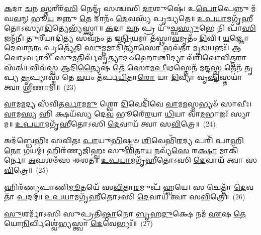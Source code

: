 {\anuvakamend[{\-\ul{𑌮}\-𑌹𑌾\-\ul{𑌨𑍍𑌨𑍃}\-𑌵𑌤𑍍𑌷𑌡𑍍𑌵𑌿𑍞᳴𑌶𑌤𑌿𑌃}]}%

\-\ul{𑌕}\-𑌦𑌾 \ul{𑌚}\-𑌨 \ul{𑌸𑍍𑌤}\-𑌰𑍀𑌰᳴\-\ul{𑌸𑌿} 𑌨𑍇𑌨𑍍𑌦𑍍𑌰᳴ 𑌸𑌶𑍍𑌚𑌸𑌿 \ul{𑌦𑌾}\-𑌶𑍁𑌷𑍇॑। 𑌉\-\ul{𑌪𑍋}\-𑌪𑍇𑌨𑍍𑌨𑍁 𑌮᳴𑌘\-\ul{𑌵}\-𑌨𑍍 𑌭𑍂\-\ul{𑌯} 𑌇𑌨𑍍𑌨𑍁 \ul{𑌤𑍇} 𑌦𑌾𑌨𑌂᳴ \ul{𑌦𑍇}\-𑌵𑌸𑍍𑌯᳴ 𑌪𑍃𑌚𑍍𑌯𑌤𑍇॥ \ul{𑌉}\-\-\ul{𑌪}\-\-\ul{𑌯𑌾}\-𑌮𑌗𑍃᳴𑌹𑍀𑌤𑍋\-𑌽𑌸𑍍𑌯𑌾\-\ul{𑌦𑌿}\-𑌤𑍍𑌯𑍇𑌭𑍍𑌯᳴𑌸𑍍𑌤𑍍𑌵𑌾॥ \ul{𑌕}\-𑌦𑌾 \ul{𑌚}\-𑌨 𑌪𑍍𑌰 𑌯𑍁᳴𑌚𑍍𑌛\-\ul{𑌸𑍍𑌯𑍁}\-𑌭𑍇 𑌨𑌿 𑌪𑌾᳴\-\ul{𑌸𑌿} 𑌜𑌨𑍍𑌮᳴𑌨𑍀। 𑌤𑍁𑌰𑍀᳴𑌯𑌾𑌦𑌿\-\ul{𑌤𑍍𑌯} 𑌸𑌵᳴𑌨𑌂 𑌤 𑌇\-\ul{𑌨𑍍𑌦𑍍𑌰𑌿}\-𑌯𑌮𑌾 𑌤᳴𑌸𑍍𑌥𑌾\-\ul{𑌵}\-𑌮𑍃𑌤𑌂᳴ \ul{𑌦𑌿}\-𑌵𑌿॥ \ul{𑌯}\-𑌜𑍍𑌞𑍋 \ul{𑌦𑍇}\-𑌵𑌾\-\ul{𑌨𑌾𑌂} 𑌪𑍍𑌰𑌤𑍍𑌯𑍇᳴𑌤𑌿 \ul{𑌸𑍁}\-𑌮𑍍𑌨𑌮𑌾𑌦𑌿᳴𑌤𑍍𑌯𑌾\-\ul{𑌸𑍋} 𑌭𑌵᳴𑌤𑌾 𑌮𑍃\-\ul{𑌡}\-𑌯𑌨𑍍𑌤𑌃᳴। 𑌆 \ul{𑌵𑍋}\-𑌽𑌰𑍍𑌵𑌾𑌚𑍀᳴ 𑌸𑍁\-\ul{𑌮}\-𑌤𑌿𑌰𑍍𑌵᳴𑌵𑍃𑌤𑍍𑌯𑌾\-\ul{𑌦}\-\-\ul{𑍞}\-𑌹𑍋\-\ul{𑌶𑍍𑌚𑌿}\-𑌦𑍍𑌯𑌾 𑌵᳴𑌰𑌿\-\ul{𑌵𑍋}\-𑌵𑌿\-\ul{𑌤𑍍𑌤}\-𑌰𑌾𑌸᳴𑌤𑍍॥ 𑌵𑌿𑌵᳴𑌸𑍍𑌵 𑌆𑌦𑌿\-\ul{𑌤𑍍𑌯𑍈}\-𑌷 𑌤𑍇᳴ 𑌸𑍋𑌮\-\ul{𑌪𑍀}\-𑌥𑌸𑍍𑌤𑍇𑌨᳴ 𑌮𑌨𑍍𑌦\-\ul{𑌸𑍍𑌵} 𑌤𑍇𑌨᳴ 𑌤𑍃𑌪𑍍𑌯 \ul{𑌤𑍃}\-𑌪𑍍𑌯𑌾𑌸𑍍𑌮᳴ 𑌤𑍇 \ul{𑌵}\-𑌯𑌂 𑌤᳴𑌰𑍍𑌪\-\ul{𑌯𑌿}\-𑌤𑌾\-\ul{𑌰𑍋} 𑌯𑌾 \ul{𑌦𑌿}\-𑌵𑍍𑌯𑌾 𑌵𑍃\-\ul{𑌷𑍍𑌟𑌿}\-𑌸𑍍𑌤𑌯𑌾॑ 𑌤𑍍𑌵𑌾 𑌶𑍍𑌰𑍀𑌣𑌾𑌮𑌿॥~(23)

{\anuvakamend[{\-\ul{𑌵𑌃} \ul{𑌸}\-𑌪𑍍𑌤𑌵𑌿𑍞᳴𑌶𑌤𑌿𑌶𑍍𑌚}]}%

\-\ul{𑌵𑌾}\-𑌮\-\ul{𑌮}\-𑌦𑍍𑌯 𑌸᳴𑌵𑌿𑌤\-\ul{𑌰𑍍𑌵𑌾}\-𑌮\-\ul{𑌮𑍁} 𑌶𑍍𑌵𑍋 \ul{𑌦𑌿}\-𑌵𑍇𑌦𑌿᳴𑌵𑍇 \ul{𑌵𑌾}\-𑌮\-\ul{𑌮}\-𑌸𑍍𑌮𑌭𑍍𑌯𑍞᳴ 𑌸𑌾𑌵𑍀𑌃। \ul{𑌵𑌾}\-𑌮\-\ul{𑌸𑍍𑌯} 𑌹𑌿 𑌕𑍍𑌷𑌯᳴𑌸𑍍𑌯 𑌦𑍇\-\ul{𑌵} 𑌭𑍂𑌰𑍇᳴\-\ul{𑌰}\-𑌯𑌾 \ul{𑌧𑌿}\-𑌯𑌾 𑌵𑌾᳴\-\ul{𑌮}\-𑌭𑌾𑌜𑌃᳴ 𑌸𑍍𑌯𑌾𑌮॥ \ul{𑌉}\-\-\ul{𑌪}\-\-\ul{𑌯𑌾}\-𑌮𑌗𑍃᳴𑌹𑍀𑌤𑍋\-𑌽𑌸𑌿 \ul{𑌦𑍇}\-𑌵𑌾𑌯᳴ 𑌤𑍍𑌵𑌾 𑌸\-\ul{𑌵𑌿}\-𑌤𑍍𑌰𑍇॥~(24)

{\anuvakamend[{\-\ul{𑌵𑌾}\-𑌮𑌂 𑌚𑌤𑍁᳴𑌰𑍍𑌵𑌿𑍞𑌶𑌤𑌿𑌃}]}%

𑌅𑌦᳴𑌬𑍍𑌧𑍇𑌭𑌿𑌃 𑌸𑌵𑌿𑌤𑌃 \ul{𑌪𑌾}\-𑌯𑍁\-\ul{𑌭𑌿}\-𑌷𑍍𑌟𑍍𑌵𑍞 \ul{𑌶𑌿}\-𑌵𑍇𑌭𑌿᳴\-\ul{𑌰}\-𑌦𑍍𑌯 𑌪𑌰𑌿᳴ 𑌪𑌾𑌹𑌿 \ul{𑌨𑍋} 𑌗𑌯𑌮𑍍॑। 𑌹𑌿𑌰᳴𑌣𑍍𑌯𑌜𑌿𑌹𑍍𑌵𑌃 𑌸𑍁\-\ul{𑌵𑌿}\-𑌤𑌾\-\ul{𑌯} 𑌨𑌵𑍍𑌯᳴\-\ul{𑌸𑍇} 𑌰\-\ul{𑌕𑍍𑌷𑌾} 𑌮𑌾𑌕𑌿᳴𑌰𑍍𑌨𑍋 \ul{𑌅}\-𑌘𑌶𑍞᳴𑌸 𑌈𑌶𑌤॥ \ul{𑌉}\-\-\ul{𑌪}\-\-\ul{𑌯𑌾}\-𑌮𑌗𑍃᳴𑌹𑍀𑌤𑍋\-𑌽𑌸𑌿 \ul{𑌦𑍇}\-𑌵𑌾𑌯᳴ 𑌤𑍍𑌵𑌾 𑌸\-\ul{𑌵𑌿}\-𑌤𑍍𑌰𑍇॥~(25)

{\anuvakamend[{𑌅𑌦᳴𑌬𑍍𑌧𑍇\-\ul{𑌭𑌿}\-𑌸𑍍𑌤𑍍𑌰𑌯𑍋᳴𑌵𑌿𑍞𑌶𑌤𑌿𑌃}]}%

𑌹𑌿𑌰᳴𑌣𑍍𑌯𑌪𑌾𑌣𑌿\-\ul{𑌮𑍂}\-𑌤𑌯𑍇᳴ 𑌸\-\ul{𑌵𑌿}\-𑌤𑌾\-\ul{𑌰}\-𑌮𑍁𑌪᳴ 𑌹𑍍𑌵𑌯𑍇। 𑌸 𑌚𑍇𑌤𑍍𑌤𑌾᳴ \ul{𑌦𑍇}\-𑌵𑌤𑌾᳴ \ul{𑌪}\-𑌦𑌮𑍍॥ \ul{𑌉}\-\-\ul{𑌪}\-\-\ul{𑌯𑌾}\-𑌮𑌗𑍃᳴𑌹𑍀𑌤𑍋\-𑌽𑌸𑌿 \ul{𑌦𑍇}\-𑌵𑌾𑌯᳴ 𑌤𑍍𑌵𑌾 𑌸\-\ul{𑌵𑌿}\-𑌤𑍍𑌰𑍇॥~(26)

{\anuvakamend[{𑌹𑌿𑌰᳴𑌣𑍍𑌯𑌪𑌾\-\ul{𑌣𑌿𑌂} 𑌚𑌤𑍁᳴𑌰𑍍𑌦𑌶}]}%

\-\ul{𑌸𑍁}\-𑌶𑌰𑍍𑌮𑌾᳴\-𑌽𑌸𑌿 𑌸𑍁𑌪𑍍𑌰𑌤𑌿\-\ul{𑌷𑍍𑌠𑌾}\-𑌨𑍋 \ul{𑌬𑍃}\-𑌹\-\ul{𑌦𑍁}\-𑌕𑍍𑌷𑍇 𑌨𑌮᳴ \ul{𑌏}\-𑌷 \ul{𑌤𑍇} 𑌯𑍋\-\ul{𑌨𑌿}\-𑌰𑍍𑌵𑌿𑌶𑍍𑌵𑍇॑𑌭𑍍𑌯𑌸𑍍𑌤𑍍𑌵𑌾 \ul{𑌦𑍇}\-𑌵𑍇𑌭𑍍𑌯𑌃᳴॥~(27)

{\anuvakamend[{\-\ul{𑌸𑍁}\-𑌶\-\ul{𑌰𑍍𑌮𑌾} 𑌦𑍍𑌵𑌾𑌦᳴𑌶}]}%

